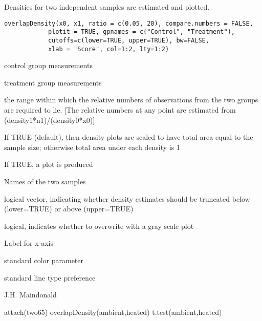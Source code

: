 \begin{Description}\relax
Densities for two independent samples are estimated and plotted.
\end{Description}
\begin{Usage}
\begin{verbatim}
overlapDensity(x0, x1, ratio = c(0.05, 20), compare.numbers = FALSE,
            plotit = TRUE, gpnames = c("Control", "Treatment"),
            cutoffs=c(lower=TRUE, upper=TRUE), bw=FALSE,
            xlab = "Score", col=1:2, lty=1:2)
\end{verbatim}
\end{Usage}
\begin{Arguments}
\begin{ldescription}
\item[\code{x0}] control group measurements
\item[\code{x1}] treatment group measurements
\item[\code{ratio}] the range within which the relative numbers of
observations from the two groups are
required to lie.  [The relative numbers at
any point are estimated from (density1*n1)/(density0*x0)]
\item[\code{compare.numbers}] If TRUE (default), then density plots
are scaled to have total area equal to the sample size; otherwise
total area under each density is 1
\item[\code{plotit}] If TRUE, a plot is produced
\item[\code{gpnames}] Names of the two samples
\item[\code{cutoffs}] logical vector, indicating whether density estimates
should be truncated below (lower=TRUE) or above (upper=TRUE)
\item[\code{bw}] logical, indicates whether to overwrite with a gray
scale plot
\item[\code{xlab}] Label for x-axis
\item[\code{col}] standard color parameter
\item[\code{lty}] standard line type preference
\end{ldescription}
\end{Arguments}
\begin{Author}\relax
J.H. Maindonald
\end{Author}
\begin{SeeAlso}\relax
{}
\end{SeeAlso}
\begin{Examples}
\begin{ExampleCode}
attach(two65)
overlapDensity(ambient,heated)
t.test(ambient,heated)
\end{ExampleCode}
\end{Examples}

